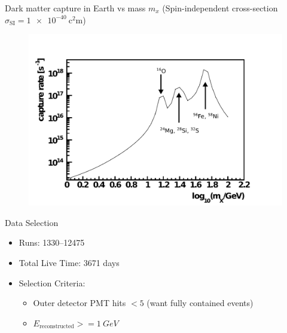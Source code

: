 \documentclass[14pt]{beamer}
\begin{document}
\begin{frame}{Dark matter capture in Earth vs mass $m_x$}
	{(Spin-independent cross-section $\sigma_{\mathrm{SI}} =
	\SI{1e-40}{\square\centi\meter}$)}
	\begin{figure}
		\centering
		\includegraphics[width=0.95\linewidth]{wimp_capture_rate.pdf}
	\end{figure}
\end{frame}

\begin{frame}{Data Selection}
	\begin{itemize}
		\item Runs: \numrange{1330}{12475}
		\item Total Live Time: 3671 days
		\item Selection Criteria:
			\begin{itemize}
				\item Outer detector PMT hits $< 5$ (want fully contained
					events)
				\item $E_{\text{reconstructed}} >= \SI{1}{GeV}$
			\end{itemize}
	\end{itemize}
\end{frame}
\end{document}
